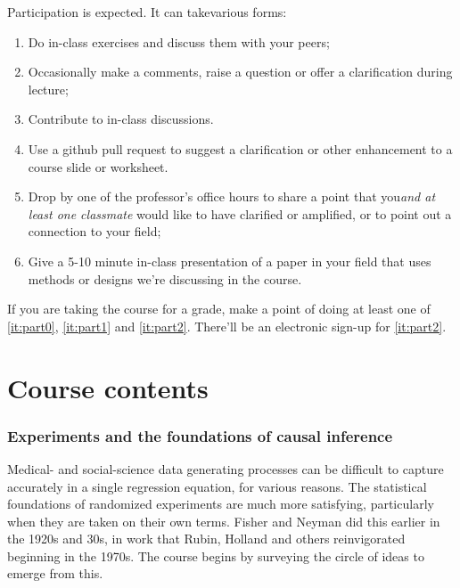 \documentclass[12pt]{article}
\begin{document}
Participation is expected.  It can takevarious forms:
\begin{enumerate}
\item Do in-class exercises and discuss them with your peers;
\item Occasionally make a comments, raise a question or offer a clarification
  during lecture;
\item Contribute to in-class discussions.
\item \label{it:part0} Use a github pull request to suggest a clarification or other enhancement to
  a course slide or worksheet.
\item \label{it:part1} Drop by one of the professor's office hours to share a point
  that you\textit{and at least one classmate} would like to have clarified or
  amplified, or to point out a connection to your field; 
\item \label{it:part2} Give a 5-10 minute in-class presentation of a paper in your
  field that uses methods or designs we're discussing in the course.
\end{enumerate}
If you are taking the course for a grade, make a point of doing at
least one of \ref{it:part0}, \ref{it:part1} and \ref{it:part2}.  There'll be an
electronic sign-up for \ref{it:part2}.



\section{Course contents}

\subsubsection{Experiments and the foundations of causal inference}

Medical- and social-science data generating processes can be difficult to
capture accurately in a single regression equation, for various reasons.  
The statistical foundations of randomized experiments are much more
satisfying, particularly when they are taken on their own
terms. Fisher and Neyman did this earlier in the 1920s and 30s, in
work that Rubin, Holland and others reinvigorated beginning in the
1970s.  The course begins by surveying the circle of ideas to emerge
from this. 
\end{document}
